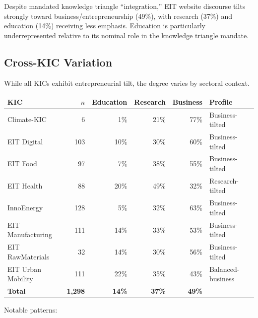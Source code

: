 \documentclass[../main.tex]{subfiles}
\begin{document}
\begin{insightbox}
Despite mandated knowledge triangle ``integration,'' EIT website discourse tilts strongly toward business/entrepreneurship (49\%), with research (37\%) and education (14\%) receiving less emphasis. Education is particularly underrepresented relative to its nominal role in the knowledge triangle mandate.
\end{insightbox}

\subsection{Cross-KIC Variation}

While all KICs exhibit entrepreneurial tilt, the degree varies by sectoral context.

\begin{center}
\small
\begin{tabular}{lrrrrl}
\toprule
\textbf{KIC} & \textbf{$n$} & \textbf{Education} & \textbf{Research} & \textbf{Business} & \textbf{Profile} \\
\midrule
Climate-KIC & 6 & 1\% & 21\% & 77\% & Business-tilted \\
EIT Digital & 103 & 10\% & 30\% & 60\% & Business-tilted \\
EIT Food & 97 & 7\% & 38\% & 55\% & Business-tilted \\
EIT Health & 88 & 20\% & 49\% & 32\% & Research-tilted \\
InnoEnergy & 128 & 5\% & 32\% & 63\% & Business-tilted \\
EIT Manufacturing & 111 & 14\% & 33\% & 53\% & Business-tilted \\
EIT RawMaterials & 32 & 14\% & 30\% & 56\% & Business-tilted \\
EIT Urban Mobility & 111 & 22\% & 35\% & 43\% & Balanced-business \\
\midrule
\textbf{Total} & \textbf{1,298} & \textbf{14\%} & \textbf{37\%} & \textbf{49\%} & \\
\bottomrule
\end{tabular}
\end{center}

Notable patterns:
\end{document}
